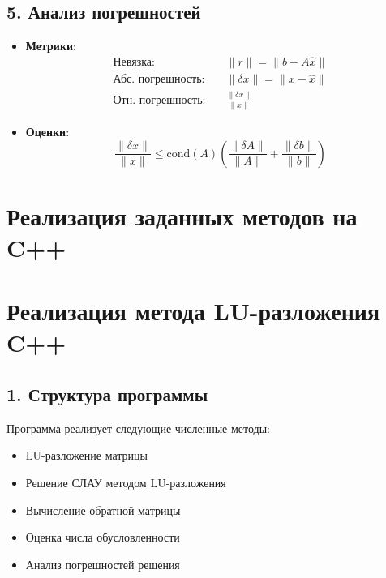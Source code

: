 \documentclass[12pt, a4paper]{article}
\begin{document}
\subsection*{5. Анализ погрешностей}
\begin{itemize}
\item \textbf{Метрики}:
\begin{align*}
\text{Невязка}: &\quad \|r\| = \|b - A\hat{x}\| \\
\text{Абс. погрешность}: &\quad \|\delta x\| = \|x - \hat{x}\| \\
\text{Отн. погрешность}: &\quad \frac{\|\delta x\|}{\|x\|}
\end{align*}
\item \textbf{Оценки}:
\begin{equation*}
\frac{\|\delta x\|}{\|x\|} \leq \text{cond}(A) \left( \frac{\|\delta A\|}{\|A\|} + \frac{\|\delta b\|}{\|b\|} \right)
\end{equation*}
\end{itemize}
\section*{Реализация заданных методов на C++}
\section*{Реализация метода LU-разложения C++}

\subsection*{1. Структура программы}
Программа реализует следующие численные методы:
\begin{itemize}
\item LU-разложение матрицы
\item Решение СЛАУ методом LU-разложения
\item Вычисление обратной матрицы
\item Оценка числа обусловленности
\item Анализ погрешностей решения
\end{itemize}
\end{document}
